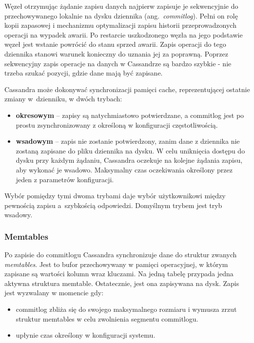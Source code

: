 Węzeł otrzymując żądanie zapisu danych najpierw zapisuje je sekwencyjnie do przechowywanego lokalnie na dysku dziennika (ang.~\textit{commitlog}).
Pełni on rolę kopii zapasowej i mechanizmu optymalizacji zapisu historii przeprowadzonych operacji na wypadek awarii.
Po restarcie uszkodzonego węzła na jego podstawie węzeł jest wstanie powrócić do stanu sprzed awarii.
Zapis operacji do tego dziennika stanowi warunek konieczny do uznania jej za poprawną.
Poprzez sekwencyjny zapis operacje na danych w Cassandrze są bardzo szybkie - nie trzeba szukać pozycji, gdzie dane mają być zapisane.

Cassandra może dokonywać synchronizacji pamięci cache, reprezentującej ostatnie zmiany w~dzienniku, w dwóch trybach:
\begin{itemize}
    \item \textbf{okresowym} -- zapisy są natychmiastowo potwierdzane, a commitlog jest po prostu zsynchronizowany z określoną w konfiguracji częstotliwością.
    \item \textbf{wsadowym} -- zapis nie zostanie potwierdzony, zanim dane z dziennika nie zostaną zapisane do pliku dziennika na dysku. 
    W celu uniknięcia dostępu do dysku przy każdym żądaniu, Cassandra oczekuje na kolejne żądania zapisu, aby wykonać je wsadowo. 
    Maksymalny czas oczekiwania określony przez jeden z parametrów konfiguracji.
\end{itemize}
Wybór pomiędzy tymi dwoma trybami daje wybór użytkownikowi między pewnością zapisu a~szybkością odpowiedzi. Domyślnym trybem jest tryb wsadowy.

\subsubsection{Memtables}

Po zapisie do commitlogu Cassandra synchronizuje dane do struktur zwanych \textit{memtables}.
Jest to bufor przechowywany w pamięci operacyjnej, w którym zapisane są wartości kolumn wraz kluczami.
Na jedną tabelę przypada jedna aktywna struktura memtable.
Ostatecznie, jest ona zapisywana na dysk.
Zapis jest wyzwalany w momencie gdy:
\begin{itemize}
    \item commitlog zbliża się do swojego maksymalnego rozmiaru i wymusza zrzut struktur memtables w celu zwolnienia segmentu commitlogu.
    \item upłynie czas określony w konfiguracji systemu.
\end{itemize}

